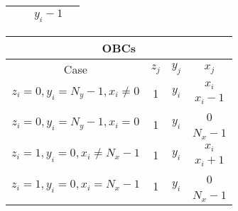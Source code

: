 \begin{table}[H]
\begin{tabular}{|c|c|c|c|}
	   	\multicolumn{1}{|c|}{}	& \multicolumn{1}{c|}{} & $y_i -1$ & \multicolumn{1}{c|}{\multirow{2}{*}{}} \\ \hline
	\end{tabular}
	\hspace{-0.1cm}
	\begin{tabular}{|c|c|c|c|} \hline
	\multicolumn{4}{|c|}{\textbf{\acp{OBC}}}							\\ \hline
		Case 				& $z_j$	& $y_j$	& $x_j$ 	\\ \hline
	\multicolumn{1}{|c|}{\multirow{2}{*}{$z_i = 0, y_i = N_y - 1, x_i \neq 0$}}	 &	\multicolumn{1}{c|}{\multirow{2}{*}{1}} & \multicolumn{1}{c|}{\multirow{2}{*}{$y_i$}} & $x_i$   \\ \cline{4-4}
	   	\multicolumn{1}{|c|}{}	& \multicolumn{1}{c|}{\multirow{2}{*}{}}  & \multicolumn{1}{c|}{}& $x_i - 1$ \\ \hline
	   	\multicolumn{1}{|c|}{\multirow{2}{*}{$z_i = 0, y_i = N_y - 1, x_i = 0$}}	 &	\multicolumn{1}{c|}{\multirow{2}{*}{1}} & \multicolumn{1}{c|}{\multirow{2}{*}{$y_i$}} & 0   \\ \cline{4-4}
	   	\multicolumn{1}{|c|}{}	& \multicolumn{1}{c|}{\multirow{2}{*}{}}  & \multicolumn{1}{c|}{}& $N_x - 1$ \\ \hline
	   	\multicolumn{1}{|c|}{\multirow{2}{*}{$z_i = 1, y_i = 0, x_i \neq N_x - 1$}}	 &	\multicolumn{1}{c|}{\multirow{2}{*}{1}} & \multicolumn{1}{c|}{\multirow{2}{*}{$y_i$}} & $x_i$   \\ \cline{4-4}
	   	\multicolumn{1}{|c|}{}	& \multicolumn{1}{c|}{\multirow{2}{*}{}}  & \multicolumn{1}{c|}{}& $x_i + 1$  \\ \hline
	   	\multicolumn{1}{|c|}{\multirow{2}{*}{$z_i = 1, y_i = 0, x_i = N_x - 1$}}	 &	\multicolumn{1}{c|}{\multirow{2}{*}{1}} & \multicolumn{1}{c|}{\multirow{2}{*}{$y_i$}} & 0   \\ \cline{4-4}
	   	\multicolumn{1}{|c|}{}	& \multicolumn{1}{c|}{\multirow{2}{*}{}}  & \multicolumn{1}{c|}{}& $N_x - 1$ \\ \hline
	\end{tabular}
	\label{tab:dummytable}
\end{table}



